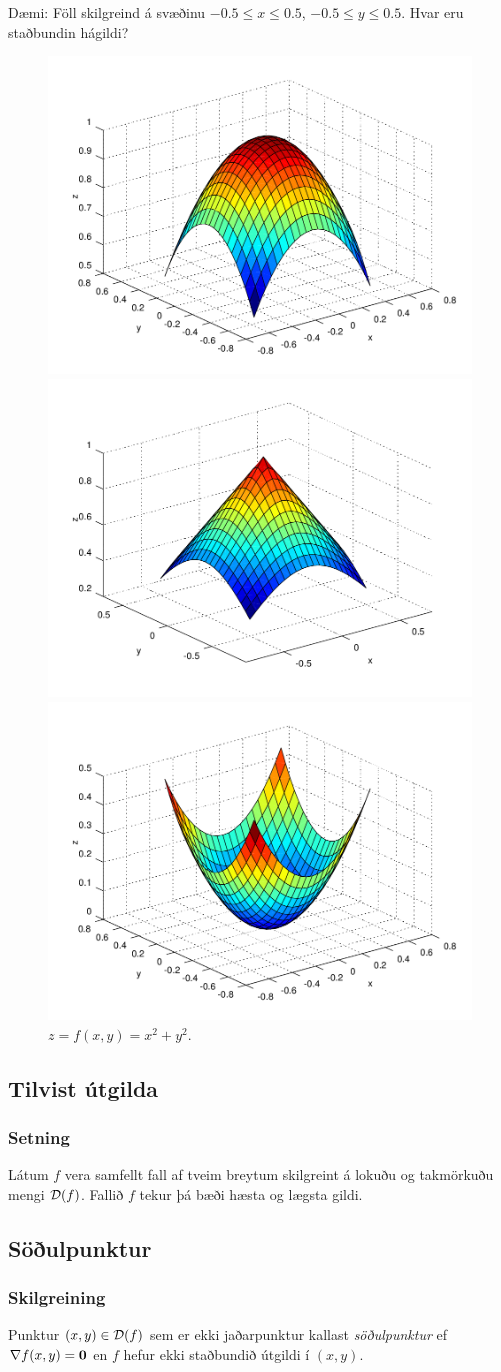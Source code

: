   Dæmi: Föll skilgreind á svæðinu $-0.5 \leq x \leq 0.5$,  $-0.5 \leq y \leq 0.5$. Hvar eru staðbundin hágildi?
  \begin{figure}[!h]
        \centering
        \begin{minipage}{\textwidth}
            \centering
            \includegraphics[width=.8 pt \linewidth]{peak_smooth.png}
            \caption*{$z = f(x,y) = 1-x^2-y^2$.}
        \end{minipage}%
        \begin{minipage}{\textwidth}
            \centering
            \includegraphics[width=.8 pt \linewidth]{peak.png}
            \caption*{$z = f(x,y) = 1-\sqrt{x^2+y^2}$.}
        \end{minipage}%
        \begin{minipage}{\textwidth}
            \centering
            \includegraphics[width=.8 pt \linewidth]{max_bound.png}
            \caption*{$z= f(x,y) = x^2+y^2$.}
        \end{minipage}
  \end{figure}

\subsection{Tilvist útgilda} 

\subsubsection{Setning  }
Látum $f$ vera samfellt fall af tveim breytum
skilgreint á lokuðu og takmörkuðu mengi ${\cal D}(f)$.  Fallið $f$
  tekur þá bæði hæsta og lægsta gildi. 

\subsection{Söðulpunktur} 

\subsubsection{Skilgreining  }
 Punktur $(x,y)\in  {\cal D}(f)$ sem er ekki
jaðarpunktur kallast {\em \color{red}söðulpunktur} ef $\nabla f(x,y)=\mbox{${\bf 0}$}$ en $f$
hefur ekki staðbundið útgildi í $(x,y)$.



